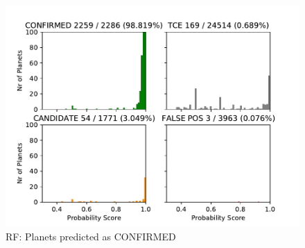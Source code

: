 
\begin{figure}[H]
		\begin{mdframed}[linecolor=green]	
                \centering
                \includegraphics[width = 1\textwidth,height=.4\textheight]{data/RF_pred_confirm.pdf}
                \caption{RF: Planets predicted as CONFIRMED}
                \label{fig:data/RF_pred_confirm}
                	\end{mdframed}	
                \end{figure}